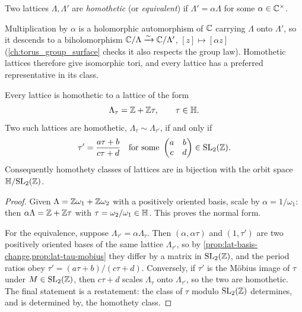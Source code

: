 \begin{definition}
\label{def:homothety}
Two lattices \(\Lambda, \Lambda'\) are \emph{homothetic} (or \emph{equivalent})
if \(\Lambda' = \alpha\Lambda\) for some \(\alpha \in \mathbb{C}^\times\).
\end{definition}

Multiplication by \(\alpha\) is a holomorphic automorphism of \(\mathbb{C}\) carrying
\(\Lambda\) onto \(\Lambda'\), so it descends to a biholomorphism
\(\mathbb{C}/\Lambda \xrightarrow{\sim} \mathbb{C}/\Lambda'\), \([z] \mapsto [\alpha z]\)
(\cref{ch:torus_group_surface} checks it also respects the group law).
Homothetic lattices therefore give isomorphic tori, and every lattice has a
preferred representative in its class.

\begin{proposition}
\label{prop:lat-normal-form}
Every lattice is homothetic to a lattice of the form
\[
  \Lambda_\tau = \mathbb{Z} + \mathbb{Z}\tau, \qquad \tau \in \mathbb{H} .
\]
Two such lattices are homothetic, \(\Lambda_\tau \sim \Lambda_{\tau'}\), if and
only if
\[
  \tau' = \frac{a\tau + b}{c\tau + d}
  \quad\text{for some }
  \begin{pmatrix} a & b \\ c & d \end{pmatrix} \in \mathrm{SL}_2(\mathbb{Z}).
\]
Consequently homothety classes of lattices are in bijection with the orbit space
\(\mathbb{H} / \mathrm{SL}_2(\mathbb{Z})\).
\end{proposition}

\begin{proof}
Given \(\Lambda = \mathbb{Z}\omega_1 + \mathbb{Z}\omega_2\) with a positively oriented basis,
scale by \(\alpha = 1/\omega_1\): then \(\alpha\Lambda = \mathbb{Z} + \mathbb{Z}\tau\) with
\(\tau = \omega_2/\omega_1 \in \mathbb{H}\). This proves the normal form.

For the equivalence, suppose \(\Lambda_{\tau'} = \alpha\Lambda_\tau\). Then
\((\alpha, \alpha\tau)\) and \((1, \tau')\) are two positively oriented bases of
the same lattice \(\Lambda_{\tau'}\), so by
\cref{prop:lat-basis-change,prop:lat-tau-mobius} they differ by a matrix in
\(\mathrm{SL}_2(\mathbb{Z})\), and the period ratios obey
\(\tau' = (a\tau+b)/(c\tau+d)\). Conversely, if \(\tau'\) is the M\"obius image
of \(\tau\) under \(M \in \mathrm{SL}_2(\mathbb{Z})\), then \(c\tau + d\) scales
\(\Lambda_\tau\) onto \(\Lambda_{\tau'}\), so the two are homothetic. The final
statement is a restatement: the class of \(\tau\) modulo
\(\mathrm{SL}_2(\mathbb{Z})\) determines, and is determined by, the homothety class.
\end{proof}

